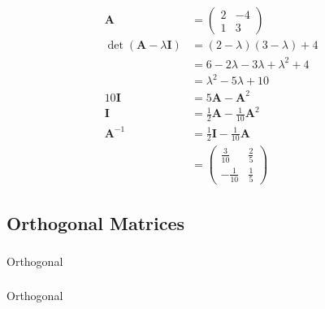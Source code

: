 \documentclass{article}
\begin{document}
\begin{align*}
  \mathbf{A}                             & = \begin{pmatrix}
                                               2 & -4 \\
                                               1 & 3
                                             \end{pmatrix}                                     \\
  \det (\mathbf{A} - \lambda \mathbf{I}) & = (2 - \lambda) (3 - \lambda) + 4                    \\
                                         & = 6 - 2 \lambda - 3 \lambda + \lambda^2 + 4          \\
                                         & = \lambda^2 - 5 \lambda + 10                         \\
  10 \mathbf{I}                          & = 5 \mathbf{A} - \mathbf{A}^2                        \\
  \mathbf{I}                             & = \frac{1}{2} \mathbf{A} - \frac{1}{10} \mathbf{A}^2 \\
  \mathbf{A}^{-1}                        & = \frac{1}{2} \mathbf{I} - \frac{1}{10} \mathbf{A}   \\
                                         & = \begin{pmatrix}
                                               \frac{3}{10}  & \frac{2}{5} \\
                                               -\frac{1}{10} & \frac{1}{5}
                                             \end{pmatrix}
\end{align*}

\subsection{Orthogonal Matrices}

\setcounter{subsubsection}{4}
\subsubsection{}

Orthogonal

\setcounter{subsubsection}{6}
\subsubsection{}

Orthogonal
\end{document}
